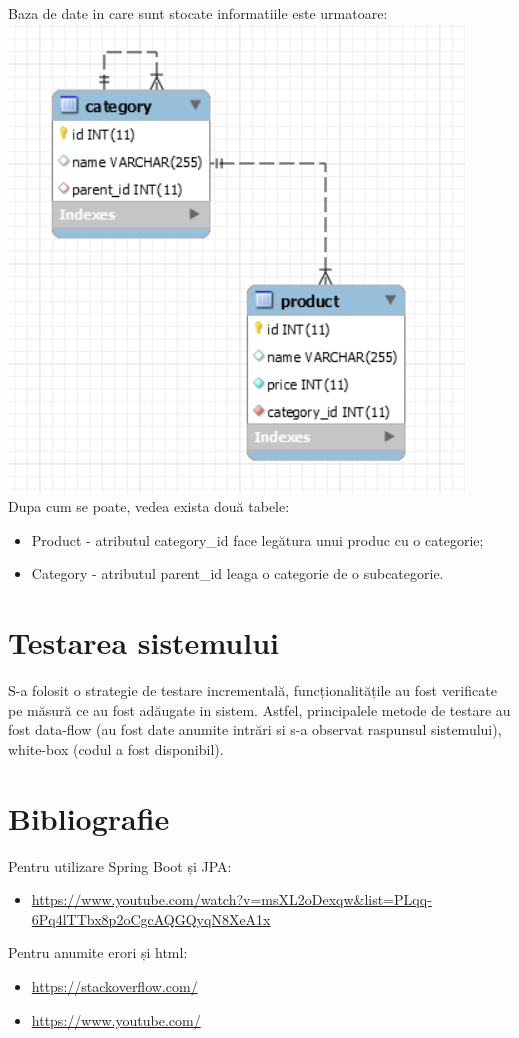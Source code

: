 \documentclass[11pt,a4paper,twoside,notitlepage]{article}
\begin{document}
Baza de date in care sunt stocate informatiile este urmatoare: \\
\includegraphics[height=.5\textheight, width=.8\textwidth]{database} \\
Dupa cum se poate, vedea exista două tabele:
\begin{itemize}
	\item Product - atributul category\_id face legătura unui produc cu o categorie;
	\item Category - atributul parent\_id leaga o categorie de o subcategorie.
\end{itemize}


\section{Testarea sistemului}

S-a folosit o strategie de testare incrementală, funcționalitățile au fost verificate pe măsură ce au fost adăugate in sistem. Astfel, principalele metode de testare au fost data-flow (au fost date anumite intrări si s-a observat raspunsul sistemului), white-box (codul a fost disponibil).

\section{Bibliografie}

Pentru utilizare Spring Boot și JPA:
\begin{itemize}
	\item \url{https://www.youtube.com/watch?v=msXL2oDexqw&list=PLqq-6Pq4lTTbx8p2oCgcAQGQyqN8XeA1x}  \\
\end{itemize}
Pentru anumite erori și html:
\begin{itemize}
	\item \url{https://stackoverflow.com/}
	\item \url{https://www.youtube.com/}	
\end{itemize}
\end{document}
